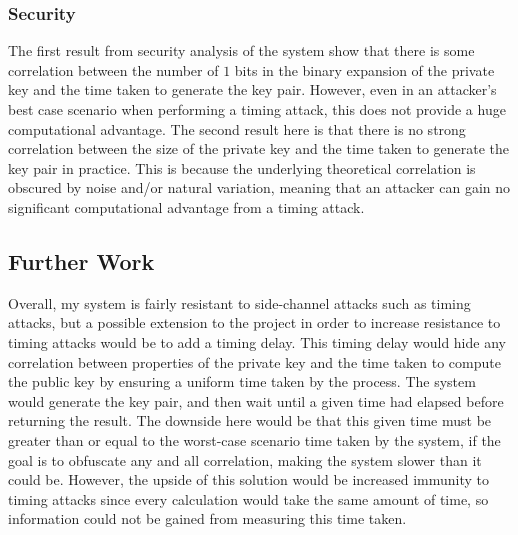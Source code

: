 \documentclass[12pt,a4paper]{article}
\begin{document}
\subsubsection{Security} \noindent
The first result from security analysis of the system show that there is some correlation between the number of $1$ bits in the binary expansion of the private key and the time taken to generate the key pair. 
However, even in an attacker's best case scenario when performing a timing attack, 
this does not provide a huge computational advantage. 
The second result here is that there is no strong correlation between the size of the private key and the time taken to generate the key pair in practice. 
This is because the underlying theoretical correlation is obscured by noise and/or natural variation, 
meaning that an attacker can gain no significant computational advantage from a timing attack. 

\subsection{Further Work} \noindent
Overall, my system is fairly resistant to side-channel attacks such as timing attacks, 
but a possible extension to the project in order to increase resistance to timing attacks would be to add a timing delay. 
This timing delay would hide any correlation between properties of the private key and the time taken to compute the public key by ensuring a uniform time taken by the process. 
The system would generate the key pair, and then wait until a given time had elapsed before returning the result. 
The downside here would be that this given time must be greater than or equal to the worst-case scenario time taken by the system, if the goal is to obfuscate any and all correlation, making the system slower than it could be. 
However, the upside of this solution would be increased immunity to timing attacks since every calculation would take the same amount of time, so information could not be gained from measuring this time taken. 



\end{document}
